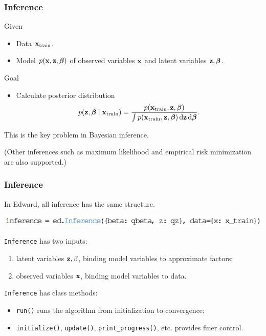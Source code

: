 \documentclass[10pt,
               xcolor={usenames,dvipsnames},
               hyperref={colorlinks,linktoc=all,citecolor=Plum,linkcolor=MidnightBlue,urlcolor=MidnightBlue},noamssymb]{beamer}
\begin{document}
\begin{frame}
\frametitle{Inference}
Given
\begin{itemize}
\item Data $\boldsymbol{\mathbf{x}}_{\text{train}}$.
\item
Model $p(\boldsymbol{\mathbf{x}}, \boldsymbol{\mathbf{z}}, \boldsymbol{\mathbf{\beta}})$ of
observed variables $\boldsymbol{\mathbf{x}}$ and latent variables $\boldsymbol{\mathbf{z}}, \boldsymbol{\mathbf{\beta}}$.
\end{itemize}
Goal
\begin{itemize}
\item
Calculate posterior distribution
\begin{equation*}
p(\boldsymbol{\mathbf{z}}, \boldsymbol{\mathbf{\beta}}\mid\boldsymbol{\mathbf{x}}_{\text{train}}) =
\frac{p(\boldsymbol{\mathbf{x}}_{\text{train}}, \boldsymbol{\mathbf{z}}, \boldsymbol{\mathbf{\beta}})}{\int
p(\boldsymbol{\mathbf{x}}_{\text{train}}, \boldsymbol{\mathbf{z}}, \boldsymbol{\mathbf{\beta}}) \operatorname{d}\!{\boldsymbol{\mathbf{z}}}\operatorname{d}\!{\boldsymbol{\mathbf{\beta}}}}.
\end{equation*}
\end{itemize}
\vspace{2ex}
This is the key problem in Bayesian inference.

(Other inferences such as maximum likelihood and empirical risk minimization
are also supported.)
\end{frame}

\begin{frame}
\frametitle{Inference}

In Edward, all inference has the same structure.

\begin{center}
\vspace{-2.0ex}
\includegraphics[height=0.05\textheight]{img/inference.png}
\end{center}

\texttt{Inference} has two inputs: \\
\begin{enumerate}
\vspace{-3ex}
\item
latent variables $\boldsymbol{\mathbf{z}},\beta$, binding model variables to approximate factors;
\item
observed variables $\boldsymbol{\mathbf{x}}$, binding model variables to data.
\end{enumerate}

\texttt{Inference} has class methods:
\begin{itemize}
\item
\texttt{run()} runs the algorithm from initialization to convergence;
\item
\texttt{initialize()}, \texttt{update()}, \texttt{print\_progress()}, etc.
provides finer control.
\end{itemize}
\end{frame}
\end{document}
